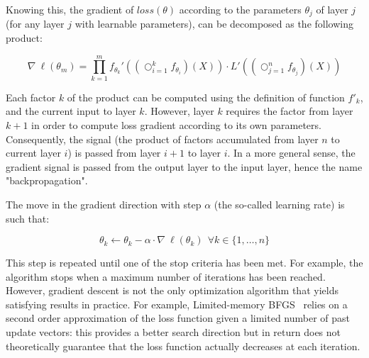         Knowing this, the gradient of $loss(\theta)$ according to the parameters $\theta_j$ of layer $j$ (for any layer $j$ with learnable parameters),  %
        can be decomposed as the following product:

        \begin{equation} \label{eq:loss}  %
            \nabla \ \ell(\theta_m) = \prod_{k=1}^m f_{\theta_k}'\left((\bigcirc_{i=1}^{k} f_{\theta_i})(X)\right) \cdot L'\left((\bigcirc_{j=1}^{n} f_{\theta_j})(X)\right)
        \end{equation}  %

        Each factor $k$ of the product can be computed using the definition of function $f'_k$, and the current input to layer $k$.
        However, layer $k$ requires the factor from layer $k+1$ in order to compute loss gradient according to its own parameters.
        Consequently, the signal (the product of factors accumulated from layer $n$ to current layer $i$) is passed from layer $i+1$ to layer $i$.
        In a more general sense, the gradient signal is passed from the output layer to the input layer, hence the name "backpropagation".

        The move in the gradient direction with step $\alpha$ (the so-called learning rate) is such that:

        \begin{equation}
            \theta_k \leftarrow \theta_k - \alpha \cdot \nabla \ \ell(\theta_k) \  \ \forall k \in \{1, \ldots, n\}  %
        \end{equation}

        This step is repeated until one of the stop criteria has been met. For example, the algorithm stops when a maximum number of iterations has been
        reached. However, gradient descent is not the only optimization algorithm that yields satisfying results in practice.
        For example, Limited-memory BFGS~\cite{LBFGS} relies on a second order approximation of the loss function given a limited number of past
        update vectors: this provides a better search direction but in return does not theoretically guarantee that the loss function actually decreases at each
        iteration.

